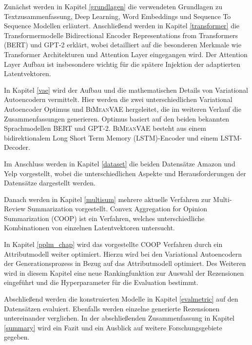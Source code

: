 Zunächst werden in Kapitel \ref{grundlagen} die verwendeten Grundlagen zu Textzusammenfassung, Deep Learning, Word Embeddings und Sequence To Sequence Modellen erläutert.
Anschließend werden in Kapitel \ref{transformer} die Transformermodelle Bidirectional Encoder Representations from Transformers (BERT) und GPT-2 erklärt, wobei detailliert auf die besonderen Merkmale wie Transformer Architekturen und Attention Layer eingegangen wird.
Der Attention Layer Aufbau ist insbesondere wichtig für die spätere Injektion der adaptierten Latentvektoren.

In Kapitel \ref{vae} wird der Aufbau und die mathematischen Details von Variational Autoencodern vermittelt.
Hier werden die zwei unterschiedlichen Variational Autoencoder Optimus und \textsc{BiMeanVAE} hergeleitet, die im weiteren Verlauf die Zusammenfassungen generieren.
Optimus basiert auf den beiden bekannten Sprachmodellen BERT und GPT-2. 
\textsc{BiMeanVAE} besteht aus einem bidirektionalem Long Short Term Memory (LSTM)-Encoder und einem LSTM-Decoder.

Im Anschluss werden in Kapitel \ref{dataset} die beiden Datensätze Amazon und Yelp vorgestellt, wobei die unterschiedlichen Aspekte und Herausforderungen der Datensätze dargestellt werden.

Danach werden in Kapitel \ref{multisum} mehrere aktuelle Verfahren zur Multi-Review Summarization vorgestellt. 
Convex Aggregation for Opinion Summarization (COOP) ist ein Verfahren, welches unterschiedliche Kombinationen von einzelnen Latentvektoren untersucht.

In Kapitel \ref{pplm_chap} wird das vorgestellte COOP Verfahren durch ein Attributmodell weiter optimiert. 
Hierzu wird bei den Variational Autoencodern der Generationsprozess in Bezug auf das Attributmodell optimiert.
Des Weiteren wird in diesem Kapitel eine neue Rankingfunktion zur Auswahl der Rezensionen eingeführt und die Hyperparameter für die Evaluation bestimmt.

Abschließend werden die konstruierten Modelle in Kapitel \ref{evalmetric} auf den Datensätzen evaluiert. Ebenfalls werden einzelne generierte Rezensionen untereinander verglichen.
In der abschließenden Zusammenfassung in Kapitel \ref{summary} wird ein Fazit und ein Ausblick auf weitere Forschungsgebiete gegeben.  





